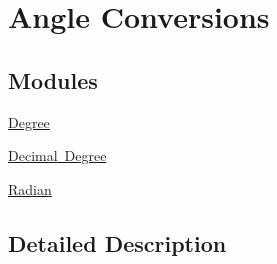 \hypertarget{group___e_g_x_math-_angle_conversions}{}\section{Angle Conversions}
\label{group___e_g_x_math-_angle_conversions}
\subsection*{Modules}
\begin{DoxyCompactItemize}
\item 
\mbox{\hyperlink{group___e_g_x_math-_angle_conversions-_degree}{Degree}}
\item 
\mbox{\hyperlink{group___e_g_x_math-_angle_conversions-_decimal_degree}{Decimal Degree}}
\item 
\mbox{\hyperlink{group___e_g_x_math-_angle_conversions-_radian}{Radian}}
\end{DoxyCompactItemize}


\subsection{Detailed Description}
